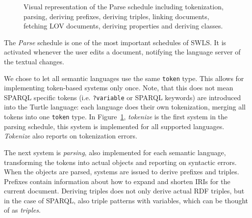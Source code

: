 \begin{figure}[tb]
 \centering
  \caption{Visual representation of the Parse schedule including tokenization, parsing, deriving prefixes, deriving triples, linking documents, fetching LOV documents, deriving properties and deriving classes. }\label{fig:Parse}
\end{figure}

The \textit{Parse} schedule is one of the most important schedules of SWLS.
It is activated whenever the user edits a document, notifying the language server of the textual changes.

We chose to let all semantic languages use the same \texttt{token} type. 
This allows for implementing token-based systems only once.
Note, that this does not mean SPARQL specific tokens (i.e. \texttt{?variable} or SPARQL keywords) are introduced into the Turtle language:  each language does their own tokenization, merging all tokens into one \texttt{token} type.
In Figure~\ref{fig:Parse}, \textit{tokenize} is the first system in the parsing schedule, this system is implemented for all supported languages. \textit{Tokenize} also reports on tokenization errors.

The next system is \textit{parsing}, also implemented for each semantic language, transforming the tokens into actual objects and reporting on syntactic errors. 
When the objects are parsed, systems are issued to derive prefixes and triples. 
Prefixes contain information about how to expand and shorten IRIs for the current document.
Deriving triples does not only derive actual RDF triples, but in the case of SPARQL, also triple patterns with variables, which can be thought of as \textit{triples}.

